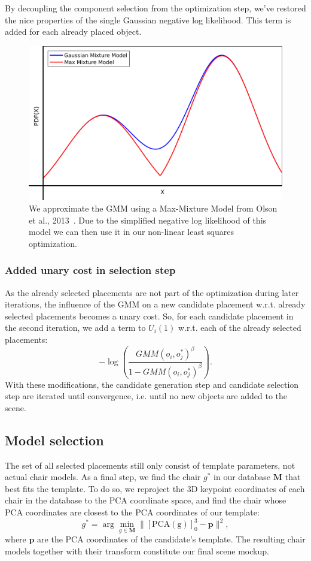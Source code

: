 \documentclass[10pt,twocolumn,letterpaper]{article}
\newcommand{\bb}[1]{{\bm{#1}}}
\begin{document}
By decoupling the component selection from the optimization step, we've
restored the nice properties of the single Gaussian negative log likelihood.
This term is added for each already placed object.

\begin{figure}
    \includegraphics[width=\linewidth]{figures/max_mixture/max_mixture}
    \caption[Max mixture model]{We approximate the GMM using a Max-Mixture Model from Olson et al., 2013~\cite{Olson:2013:IJRR}. Due to the simplified negative log likelihood of this model we can then use it in our non-linear least squares optimization.}
    \label{fig:ch4:max_mixture}
\end{figure}

\subsubsection{Added unary cost in selection step}
As the already selected placements are not part of the optimization during later iterations,
the influence of the GMM on a new candidate placement w.r.t. already selected placements becomes
a unary cost. So, for each candidate placement in the second iteration, we add a term to $U_i(1)$
w.r.t. each of the already selected placements:
%
\[ -\log\left(\frac{GMM(o_i, o^*_j)^\beta}{1 - GMM(o_i, o^*_j)^\beta}\right). \]
%
With these modifications, the candidate generation step and candidate selection
step are iterated until convergence, i.e. until no new objects are added to the
scene.

\subsection{Model selection}
\label{sec:ch4:model_selection}
The set of all selected placements still only consist of template parameters, not actual chair models.
As a final step, we find the chair $g^*$ in our database $\bb{M}$ that best fits the
template. To do so, we reproject the 3D keypoint coordinates of each chair in
the database to the PCA coordinate space, and find the chair whose PCA
coordinates are closest to the PCA coordinates of our template:
%
\[ g^* = \arg\min_{g \in \bb{M}} \|[\mathrm{PCA(g)}]_0^3 - \bb{p}\|^2, \]
where $\bb{p}$ are the PCA coordinates of the candidate's template.
%
The resulting chair models together with their transform constitute our final scene mockup.
\end{document}
